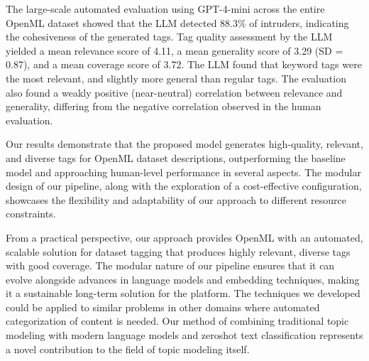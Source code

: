 The large-scale automated evaluation using GPT-4-mini across the entire OpenML dataset showed that the LLM detected 88.3\% of intruders, indicating the cohesiveness of the generated tags. Tag quality assessment by the LLM yielded a mean relevance score of 4.11, a mean generality score of 3.29 (SD = 0.87), and a mean coverage score of 3.72. The LLM found that keyword tags were the most relevant, and slightly more general than regular tags. The evaluation also found a weakly positive (near-neutral) correlation between relevance and generality, differing from the negative correlation observed in the human evaluation.

Our results demonstrate that the proposed model generates high-quality, relevant, and diverse tags for OpenML dataset descriptions, outperforming the baseline model and approaching human-level performance in several aspects. The modular design of our pipeline, along with the exploration of a cost-effective configuration, showcases the flexibility and adaptability of our approach to different resource constraints.

From a practical perspective, our approach provides OpenML with an automated, scalable solution for dataset tagging that produces highly relevant, diverse tags with good coverage. The modular nature of our pipeline ensures that it can evolve alongside advances in language models and embedding techniques, making it a sustainable long-term solution for the platform. The techniques we developed could be applied to similar problems in other domains where automated categorization of content is needed. Our method of combining traditional topic modeling with modern language models and zeroshot text classification represents a novel contribution to the field of topic modeling itself.